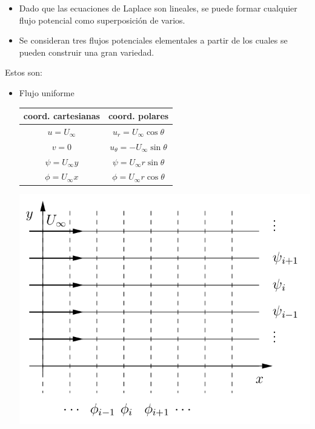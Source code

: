 	\begin{itemize}
		\item Dado que las ecuaciones de Laplace son lineales, se puede formar cualquier
		flujo potencial como superposición de varios.
		\item Se consideran tres flujos potenciales elementales a partir de los
		cuales se pueden construir una gran variedad. 
	\end{itemize}
	Estos son:
 \begin{itemize}
 	
\item{Flujo uniforme}
	
	\begin{minipage}[c]{0.6\textwidth}%
		\begin{tabular}{|c|c|}
			\hline 
			coord. cartesianas  & coord. polares \tabularnewline
			\hline 
			$u=U_{\infty}$  & $u_{r}=U_{\infty}\cos\theta$ \tabularnewline
			$v=0$  & $u_{\theta}=-U_{\infty}\sin\theta$ \tabularnewline
			$\psi=U_{\infty}y$  & $\psi=U_{\infty}r\sin\theta$ \tabularnewline
			$\phi=U_{\infty}x$  & $\phi=U_{\infty}r\cos\theta$ \tabularnewline
			\hline 
		\end{tabular}%
	\end{minipage}%
	\begin{minipage}[c]{0.4\textwidth}%
		
\begin{center}
	\includegraphics[width=\linewidth]{TeX_files/chapter09-Externo/uniforme}
\end{center}



\end{minipage}
\end{itemize}
